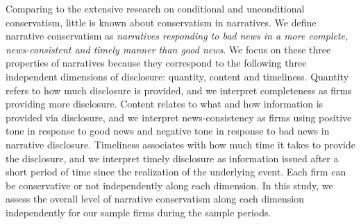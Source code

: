 \documentclass[a4paper]{article}
\begin{document}
\begin{spacing}{2}
Comparing to the extensive research on conditional and unconditional conservatism, little is known about conservatism in narratives. We define narrative conservatism as \textit{narratives responding to bad news in a more complete, news-consistent and timely manner than good news}. We focus on these three properties of narratives because they correspond to the following three independent dimensions of disclosure: quantity, content and timeliness. Quantity refers to how much disclosure is provided, and we interpret completeness as firms providing more disclosure. Content relates to what and how information is provided via disclosure, and we interpret news-consistency as firms using positive tone in response to good news and negative tone in response to bad news in narrative disclosure. Timeliness associates with how much time it takes to provide the disclosure, and we interpret timely disclosure as information issued after a short period of time since the realization of the underlying event. Each firm can be conservative or not independently along each dimension. In this study, we assess the overall level of narrative conservatism along each dimension independently for our sample firms during the sample periods. 


\end{spacing}
\end{document}

